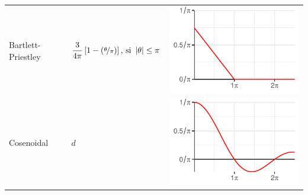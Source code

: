 \begin{SidewaysTable}
\begin{tabular}{lll}
\rowcolor{gris}
Bartlett-Priestley &
$\displaystyle 
\frac{3}{4 \pi} \left[ 1 - \left( \nicefrac{\theta}{\pi} \right) \right]
\text{, si } \left| \theta \right|\leq \pi
$
& \includegraphics[scale=.4]{./img_ventanas/ventana_2_bartlet_priestley.pdf} \\
Cosenoidal &
$\displaystyle 
d
$
& \includegraphics[scale=.4]{./img_ventanas/ventana_2_bartlett.pdf} \\
\bottomrule
\end{tabular}
\end{SidewaysTable}

